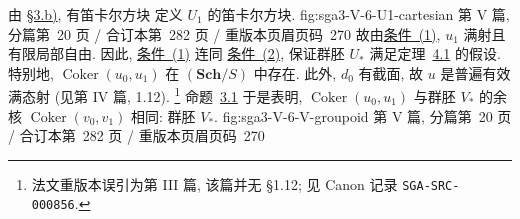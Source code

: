 由 \hyperref[par:sga3-V-3-b]{\S3.b)}, 有笛卡尔方块
  {定义 \(U_1\) 的笛卡尔方块.}
  {fig:sga3-V-6-U1-cartesian}
  {第 V 篇, 分篇第~20 页 / 合订本第~282 页 / 重版本页眉页码~270}
故由\hyperref[def:sga3-V-6-quasisection-1]{条件~(1)},
\(u_1\) 满射且有限局部自由. 因此,
\hyperref[def:sga3-V-6-quasisection-1]{条件~(1)} 连同
\hyperref[def:sga3-V-6-quasisection-2]{条件~(2)},
保证群胚 \(U_\ast\) 满足定理~\hyperref[thm:sga3-V-4.1]{4.1} 的假设.
特别地, \(\operatorname{Coker}(u_0,u_1)\) 在 \((\mathbf{Sch}/S)\) 中存在.
此外, \(d_0\) 有截面, 故 \(u\) 是普遍有效满态射
(见第 IV 篇, 1.12).
\footnote{法文重版本误引为第 III 篇, 该篇并无 \S1.12;
见 Canon 记录 \texttt{SGA-SRC-000856}.}
命题~\hyperref[prop:sga3-V-3.1]{3.1} 于是表明,
\(\operatorname{Coker}(u_0,u_1)\) 与群胚 \(V_\ast\)
的余核 \(\operatorname{Coker}(v_0,v_1)\) 相同:
  {群胚 \(V_\ast\).}
  {fig:sga3-V-6-V-groupoid}
  {第 V 篇, 分篇第~20 页 / 合订本第~282 页 / 重版本页眉页码~270}

